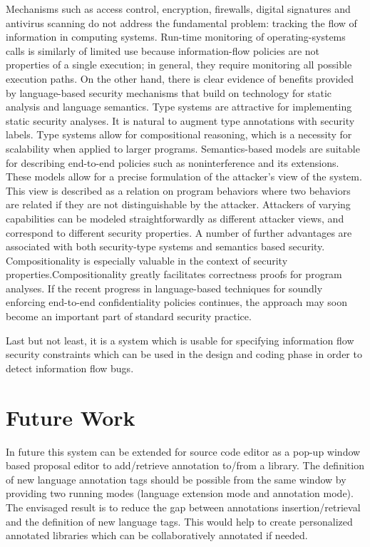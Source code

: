 Mechanisms such as access control, encryption, firewalls, digital
signatures and antivirus scanning do not address the fundamental
problem: tracking the flow of information in computing
systems. Run-time monitoring of operating-systems calls is
similarly of limited use because information-flow policies are
not properties of a single execution; in general, they require
monitoring all possible execution paths. On the other hand,
there is clear evidence of benefits provided by language-based
security mechanisms that build on technology for static analysis
and language semantics. Type systems are attractive for
implementing static security analyses. It is natural to augment
type annotations with security labels. Type systems allow for
compositional reasoning, which is a necessity for scalability
when applied to larger programs. Semantics-based models
are suitable for describing end-to-end policies such as
noninterference and its extensions. These models allow for a
precise formulation of the attacker's view of the system. This
view is described as a relation on program behaviors where
two behaviors are related if they are not distinguishable by
the attacker. Attackers of varying capabilities can be modeled
straightforwardly as different attacker views, and correspond
to different security properties. A number of further advantages are
associated with both security-type systems and semantics based
security. Compositionality is especially valuable in the
context of security properties.Compositionality
greatly facilitates correctness proofs for program analyses. If the recent
progress in language-based techniques for soundly enforcing
end-to-end confidentiality policies continues, the approach
may soon become an important part of standard security
practice.

Last but not least, it is a system which is usable for specifying information flow security constraints which can be used in the design and coding phase in order to detect information flow bugs.

\section{Future Work}
In future this system can be extended for source code editor as
a pop-up window based proposal editor to add/retrieve
annotation to/from a library. The definition of new language
annotation tags should be possible from the same window by
providing two running modes (language extension mode and
annotation mode). The envisaged result is to reduce the gap
between annotations insertion/retrieval and the definition of
new language tags. This would help to create personalized
annotated libraries which can be collaboratively annotated if
needed.

